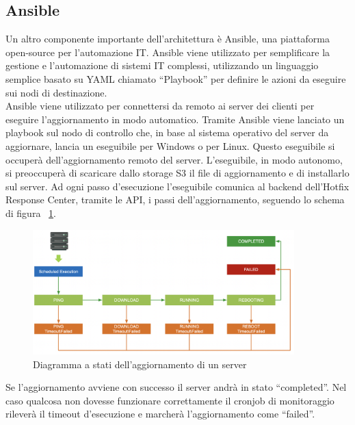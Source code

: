\subsection{Ansible}
\label{subsec:Ansible}
Un altro componente importante dell’architettura è Ansible, una piattaforma 
open-source per l'automazione IT. Ansible viene utilizzato per semplificare 
la gestione e l'automazione di sistemi IT complessi, utilizzando un 
linguaggio semplice basato su YAML chiamato “Playbook” per 
definire le azioni da eseguire sui nodi di destinazione. ~\cite{wiki:ansible}\\

Ansible viene utilizzato per connettersi da remoto ai server dei clienti per 
eseguire l’aggiornamento in modo automatico. Tramite Ansible viene lanciato un 
playbook sul nodo di controllo che, in base al sistema operativo del server da 
aggiornare, lancia un eseguibile per Windows o per Linux.
Questo eseguibile si occuperà dell'aggiornamento remoto del server. 
L’eseguibile, in modo autonomo, si preoccuperà di scaricare dallo storage 
S3 il file di aggiornamento e di installarlo sul server. 
Ad ogni passo d’esecuzione l’eseguibile comunica al backend dell’Hotfix Response Center, 
tramite le API, i passi dell’aggiornamento, seguendo lo schema di 
figura ~\ref{fig:Diagramma a stati dell'aggiornamento di un server}.

 \begin{figure}[H]
  \begin{flushright}
    \centering
    \includegraphics[width=0.90\textwidth]{imgs/update_statues.png}
    \caption{Diagramma a stati dell'aggiornamento di un server}
    \label{fig:Diagramma a stati dell'aggiornamento di un server}
  \end{flushright}
\end{figure}

Se l’aggiornamento avviene con successo il server andrà in stato “completed”.
Nel caso qualcosa non dovesse funzionare correttamente il cronjob di monitoraggio 
rileverà il timeout d’esecuzione e marcherà l’aggiornamento come “failed”.
